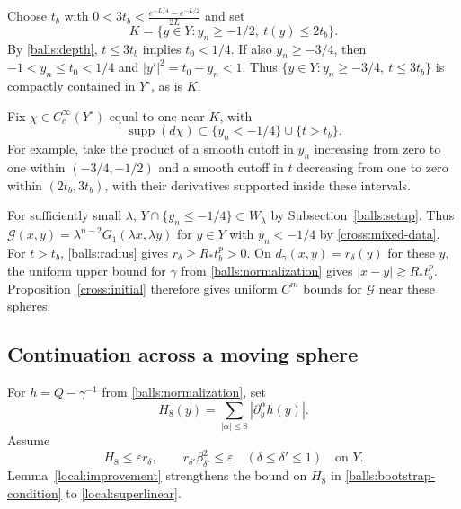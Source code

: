 \documentclass[11pt,a4paper]{article}
\theoremstyle{definition}
\theoremstyle{remark}
\numberwithin{equation}{section}
\begin{document}
Choose $t_b$ with $0<3t_b<\frac{e^{-L/4}-e^{-L/2}}{2L}$ and set
\begin{equation}\label{balls:K}
 K=\{y\in Y:y_n\geq-1/2,\ t(y)\leq2t_b\}.
\end{equation}
By \eqref{balls:depth}, $t\leq3t_b$ implies $t_0<1/4$. If also
$y_n\geq-3/4$, then $-1<y_n\leq t_0<1/4$ and
$|y'|^2=t_0-y_n<1$. Thus $\{y\in Y:y_n\geq-3/4,\ t\leq3t_b\}$
is compactly contained in $Y^\circ$, as is $K$.

Fix $\chi\in C_c^\infty(Y^\circ)$ equal to one near $K$, with
\begin{equation}\label{balls:cutoff-region}
 \operatorname{supp}(d\chi)\subset
       \{y_n<-1/4\}\cup\{t>t_b\}.
\end{equation}
For example, take the product of a smooth cutoff in $y_n$ increasing
from zero to one within $(-3/4,-1/2)$ and a smooth cutoff in $t$
decreasing from one to zero within $(2t_b,3t_b)$, with their
derivatives supported inside these intervals.

For sufficiently small $\lambda$, $Y\cap\{y_n\leq-1/4\}\subset
W_\lambda$ by Subsection~\ref{balls:setup}. Thus
$\mathcal G(x,y)=\lambda^{n-2}G_1(\lambda x,\lambda y)$ for
$y\in Y$ with $y_n<-1/4$ by \eqref{cross:mixed-data}.
For $t>t_b$, \eqref{balls:radius} gives $r_\delta\geq R_*t_b^p>0$.
On $d_\gamma(x,y)=r_\delta(y)$ for these $y$, the uniform upper
bound for $\gamma$ from \eqref{balls:normalization} gives
$|x-y|\gtrsim R_*t_b^p$. Proposition~\ref{cross:initial} therefore
gives uniform $C^m$ bounds for $\mathcal G$ near these spheres.

\subsection{Continuation across a moving sphere}

For $h=Q-\gamma^{-1}$ from \eqref{balls:normalization}, set
\[
 H_8(y)=\sum_{|\alpha|\leq8}|\partial_y^\alpha h(y)|.
\]
Assume
\begin{equation}\label{balls:bootstrap-condition}
 H_8\leq\varepsilon r_\delta,\qquad
 r_{\delta'}\beta_{\delta'}^2\leq\varepsilon
       \quad(\delta\leq\delta'\leq1)
 \quad\text{on }Y.
\end{equation}
Lemma~\ref{local:improvement} strengthens the bound on $H_8$ in
\eqref{balls:bootstrap-condition} to \eqref{local:superlinear}.
\end{document}
